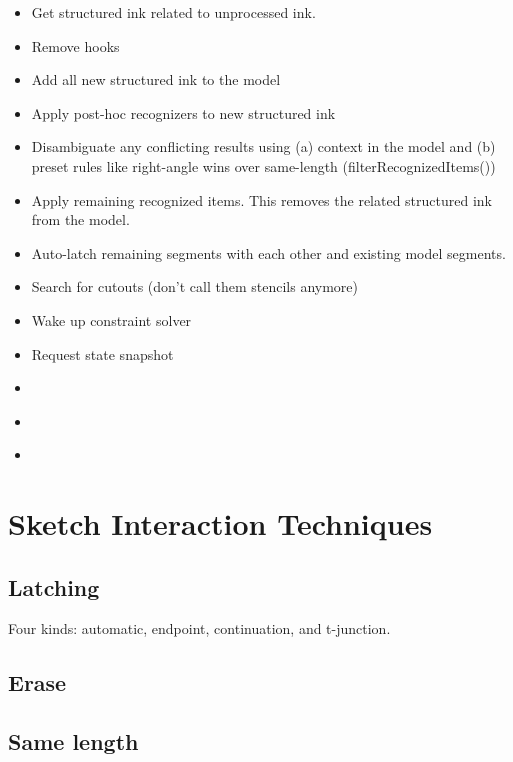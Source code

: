 \begin{itemize}
\item Get structured ink related to unprocessed ink.
\item Remove hooks
\item Add all new structured ink to the model
\item Apply post-hoc recognizers to new structured ink
\item Disambiguate any conflicting results using (a) context in the
  model and (b) preset rules like right-angle wins over same-length
  (filterRecognizedItems())
\item Apply remaining recognized items. This removes the related
  structured ink from the model.
\item Auto-latch remaining segments with each other and existing model
  segments.
\item Search for cutouts (don't call them stencils anymore)
\item Wake up constraint solver
\item Request state snapshot
\end{itemize}

\begin{itemize}
\item 
\end{itemize}

\begin{itemize}
\item 
\end{itemize}

\begin{itemize}
\item 
\end{itemize}

\section{Sketch Interaction Techniques}

\subsection{Latching}

Four kinds: automatic, endpoint, continuation, and t-junction.

\subsection{Erase}

\subsection{Same length}


